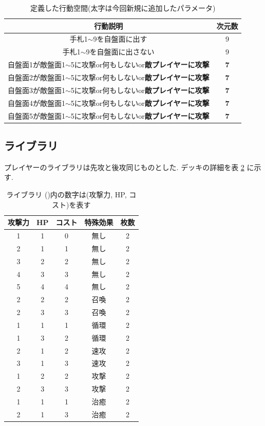 \documentclass{jarticle}     %
\begin{document}
  \begin{table}[H]
    \centering
    \caption{定義した行動空間(太字は今回新規に追加したパラメータ)}
    \label{table:action}
    \begin{tabular}{|c|c|}
    \hline
    行動説明                          & 次元数        \\ \hline
    手札1$\sim$9を自盤面に出す             & 9          \\ \hline
    手札1$\sim$9を自盤面に出さない & 9 \\ \hline
    自盤面1が敵盤面1$\sim$5に攻撃or何もしないor\textbf{敵プレイヤーに攻撃}    & \textbf{7}          \\ \hline
    自盤面2が敵盤面1$\sim$5に攻撃or何もしないor\textbf{敵プレイヤーに攻撃}    & \textbf{7}   \\ \hline
    自盤面3が敵盤面1$\sim$5に攻撃or何もしないor\textbf{敵プレイヤーに攻撃}    & \textbf{7}\\ \hline
    自盤面4が敵盤面1$\sim$5に攻撃or何もしないor\textbf{敵プレイヤーに攻撃}    & \textbf{7} \\ \hline
    自盤面5が敵盤面1$\sim$5に攻撃or何もしないor\textbf{敵プレイヤーに攻撃}    & \textbf{7}\\ \hline
    \end{tabular}
    \end{table}
  
\subsection{ライブラリ}
プレイヤーのライブラリは先攻と後攻同じものとした.
デッキの詳細を表 \ref{table:deck} に示す.

\begin{table}[H]
  \centering
  \caption{ライブラリ ()内の数字は(攻撃力, HP, コスト)を表す}
  \label{table:deck}
  \begin{tabular}{|c|c|c|c|c|}
  \hline
  攻撃力 & HP & コスト & 特殊効果 & 枚数 \\ \hline
  1 & 1 & 0 & 無し & 2 \\ \hline
  2 & 1 & 1 & 無し & 2 \\ \hline
  3 & 2 & 2 & 無し & 2 \\ \hline
  4 & 3 & 3 & 無し & 2 \\ \hline
  5 & 4 & 4 & 無し & 2 \\ \hline
  2 & 2 & 2 & 召喚 & 2 \\ \hline
  2 & 3 & 3 & 召喚 & 2 \\ \hline
  1 & 1 & 1 & 循環 & 2 \\ \hline
  1 & 3 & 2 & 循環 & 2 \\ \hline
  2 & 1 & 2 & 速攻 & 2 \\ \hline
  3 & 1 & 3 & 速攻 & 2 \\ \hline
  1 & 2 & 2 & 攻撃 & 2 \\ \hline
  2 & 3 & 3 & 攻撃 & 2 \\ \hline
  1 & 1 & 1 & 治癒 & 2 \\ \hline
  2 & 1 & 3 & 治癒 & 2 \\ \hline
  \end{tabular}
  \end{table}
\end{document}
